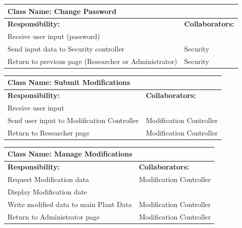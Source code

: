 \documentclass[]{article}
\begin{document}
		\centering
		\begin{tabular}{|p{7cm}|p{7cm}|}
		\hline 
		 \multicolumn{2}{|l|}{\textbf{Class Name: Change Password}} \\
		\hline
		\textbf{Responsibility:} & \textbf{Collaborators:} \\
		\hline
		Receive user input (password) & \\
		\hline
		Send input data to Security controller & Security \\
		\hline
		Return to previous page (Researcher or Administrator) & Security \\
		\hline
		\end{tabular}
	\newline
	\vspace*{0.5 cm}
	\newline
		\centering
		\begin{tabular}{|p{7cm}|p{7cm}|}
		\hline 
		 \multicolumn{2}{|l|}{\textbf{Class Name: Submit Modifications}} \\
		\hline
		\textbf{Responsibility:} & \textbf{Collaborators:} \\
		\hline
		Receive user input & \\
		\hline
		Send user input to Modification Controller  & Modification Controller \\
		\hline
		Return to Researcher page & Modification Controller \\
		\hline
		\end{tabular}
	\newline
	\vspace*{0.5 cm}
	\newline
		\centering
		\begin{tabular}{|p{7cm}|p{7cm}|}
		\hline 
		 \multicolumn{2}{|l|}{\textbf{Class Name: Manage Modifications}} \\
		\hline
		\textbf{Responsibility:} & \textbf{Collaborators:} \\
		\hline
		Request Modification data & Modification Controller \\
		\hline
		Display Modification date & \\
		\hline
		Write modified data to main Plant Data & Modification Controller \\
		\hline
		Return to Administrator page & Modification Controller \\
		\hline
		\end{tabular}
	\newline
	\vspace*{0.5 cm}
	\newline
\end{document}
